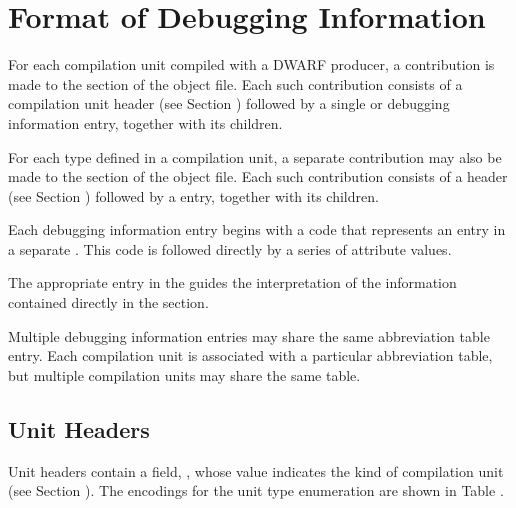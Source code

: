 \section{Format of Debugging Information}
\label{datarep:formatofdebugginginformation}

For each compilation unit compiled with a DWARF producer,
a contribution is made to the \dotdebuginfo{} section of
the object file. Each such contribution consists of a
compilation unit header 
(see Section ) 
followed by a single \DWTAGcompileunit{} or 
\DWTAGpartialunit{} debugging
information entry, together with its children.

For each type defined in a compilation unit, a separate
contribution may also be made to the \dotdebuginfo{} 
section of the object file. Each
such contribution consists of a  header 
(see Section ) 
followed by a \DWTAGtypeunit{} entry, together with
its children.

Each debugging information entry begins with a code that
represents an entry in a separate 
. This
code is followed directly by a series of attribute values.

The appropriate entry in the 
 guides the
interpretation of the information contained directly in the
\dotdebuginfo{} section.

Multiple debugging information entries may share the same
abbreviation table entry. Each compilation unit is associated
with a particular abbreviation table, but multiple compilation
units may share the same table.

\subsection{Unit Headers}
\label{datarep:unitheaders}
Unit headers contain a field, \HFNunittype{}, whose value indicates the kind of
compilation unit (see Section ).
\db
The encodings for the unit type 
enumeration are shown in Table .

